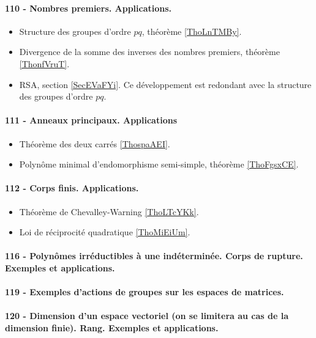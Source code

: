 \paragraph{110 - Nombres premiers. Applications.}
\begin{itemize}
    \item Structure des groupes d'ordre \( pq\), théorème \ref{ThoLnTMBy}.
    \item Divergence de la somme des inverses des nombres premiers, théorème \ref{ThonfVruT}.
    \item RSA, section \ref{SecEVaFYi}. Ce développement est redondant avec la structure des groupes d'ordre \( pq\).
\end{itemize}

\paragraph{111 - Anneaux principaux. Applications}
\begin{itemize}
    \item Théorème des deux carrés \ref{ThospaAEI}.
    \item Polynôme minimal d'endomorphisme semi-simple, théorème \ref{ThoFgsxCE}.
\end{itemize}

\paragraph{112 - Corps finis. Applications.}
\begin{itemize}
    \item Théorème de Chevalley-Warning \ref{ThoLTcYKk}.
    \item Loi de réciprocité quadratique \ref{ThoMiEiUm}.
\end{itemize}

\paragraph{116 - Polynômes irréductibles à une indéterminée. Corps de rupture. Exemples et applications.}
\paragraph{119 - Exemples d’actions de groupes sur les espaces de matrices.}
\paragraph{120 - Dimension d’un espace vectoriel (on se limitera au cas de la dimension finie). Rang. Exemples et applications.}
